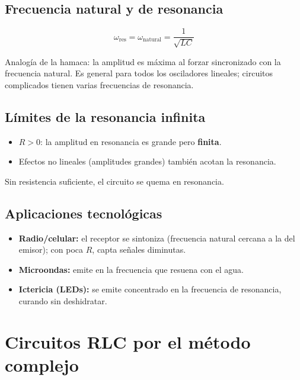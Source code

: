 \documentclass[12pt,a4paper]{article}
\begin{document}
\subsection{Frecuencia natural y de resonancia}

\begin{keybox}[Resonancia]
  \[
  \boxed{\omega_{\text{res}} = \omega_{\text{natural}} = \frac{1}{\sqrt{LC}}}
  \]
\end{keybox}

Analogía de la hamaca: la amplitud es máxima al forzar sincronizado con la
frecuencia natural. Es general para todos los osciladores lineales; circuitos
complicados tienen varias frecuencias de resonancia.

\subsection{Límites de la resonancia infinita}

\begin{itemize}[nosep]
  \item $R > 0$: la amplitud en resonancia es grande pero \textbf{finita}.
  \item Efectos no lineales (amplitudes grandes) también acotan la resonancia.
\end{itemize}

\begin{warnbox}[Se quema]
  Sin resistencia suficiente, el circuito se quema en resonancia.
\end{warnbox}

\subsection{Aplicaciones tecnológicas}

\begin{itemize}[nosep]
  \item \textbf{Radio/celular:} el receptor se sintoniza (frecuencia natural
        cercana a la del emisor); con poca $R$, capta señales diminutas.
  \item \textbf{Microondas:} emite en la frecuencia que resuena con el agua.
  \item \textbf{Ictericia (LEDs):} se emite concentrado en la frecuencia de
        resonancia, curando sin deshidratar.
\end{itemize}

\section{Circuitos RLC por el método complejo}
\end{document}
